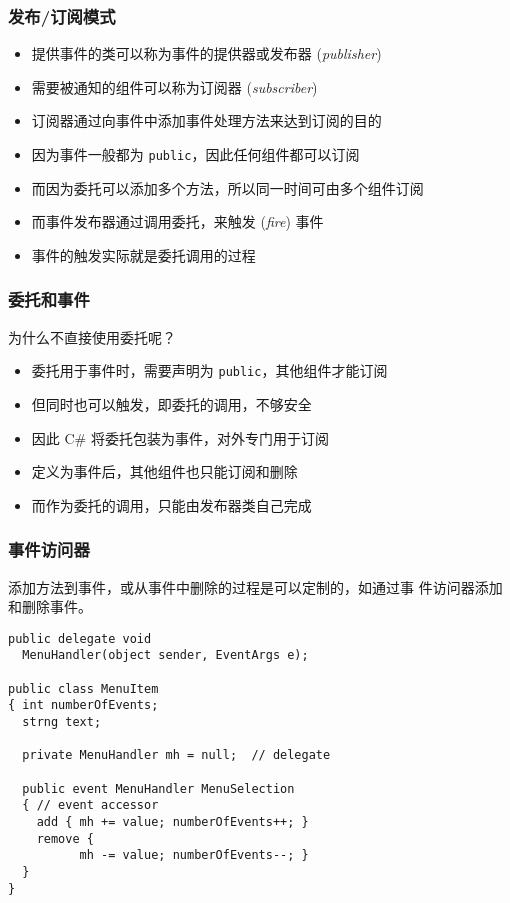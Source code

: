 \begin{frame}
\frametitle{发布/订阅模式}
\begin{itemize}
\item 提供事件的类可以称为事件的提供器或发布器 (\textit{publisher})
\item 需要被通知的组件可以称为订阅器 (\textit{subscriber})
\end{itemize}
\bigskip \pause
\begin{itemize}
\setlength{\itemsep}{4pt plus 1pt}
\item 订阅器通过向事件中添加事件处理方法来达到订阅的目的
\item 因为事件一般都为 \texttt{public}，因此任何组件都可以订阅
\item 而因为委托可以添加多个方法，所以同一时间可由多个组件订阅
\item 而事件发布器通过调用委托，来触发 (\textit{fire}) 事件
\item 事件的触发实际就是委托调用的过程
\end{itemize}
\end{frame}

\begin{frame}[fragile]
\frametitle{委托和事件}
为什么不直接使用委托呢？
\begin{itemize}
\setlength{\itemsep}{6pt plus 1pt}
\item 委托用于事件时，需要声明为 \texttt{public}，其他组件才能订阅
\item 但同时也可以触发，即委托的调用，不够安全
\item 因此 C\# 将委托包装为事件，对外专门用于订阅
\item 定义为事件后，其他组件也只能订阅和删除
\item 而作为委托的调用，只能由发布器类自己完成
\end{itemize}
\end{frame}

\begin{frame}
\frametitle{事件访问器}
\CJKindent 添加方法到事件，或从事件中删除的过程是可以定制的，如通过{\redwarn 事
件访问器}添加和删除事件。
\begin{lstlisting}
public delegate void
  MenuHandler(object sender, EventArgs e);

public class MenuItem
{ int numberOfEvents;
  strng text;

  private MenuHandler mh = null;  // delegate

  public event MenuHandler MenuSelection 
  { // event accessor
    add { mh += value; numberOfEvents++; }
    remove {
          mh -= value; numberOfEvents--; }
  }
}

\end{lstlisting}
\end{frame}

